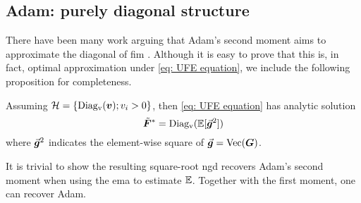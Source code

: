 \subsection{Adam: purely diagonal structure}
\label{subsec: existing optimizer}
There have been many work arguing that Adam's second moment aims to approximate the diagonal of \gls{fim} \citep{kingma2014adam, hwang2024fadam, sun2021connection}. Although it is easy to prove that this is, in fact, optimal approximation under \cref{eq: UFE equation}, we include the following proposition for completeness. 
\begin{proposition}
    Assuming $\mathcal{H} =\{\operatorname{Diag_v}({\bm{v}}); v_i>0\}$, then \cref{eq: UFE equation} has analytic solution 
    \begin{equation}
        \tilde{\bm{F}}^* = \operatorname{Diag_v}(\mathbb{E}[\vec{\bm{g}}^2])
    \end{equation}
where $\vec{\bm{g}}^2$ indicates the element-wise square of $\vec{\bm{g}}=\operatorname{Vec}({\bm{G}})$. 
\label{prop: adam solution}
\end{proposition}
It is trivial to show the resulting square-root \gls{ngd} recovers Adam's second moment when using the \gls{ema} to estimate $\mathbb{E}$. Together with the first moment, one can recover Adam.

